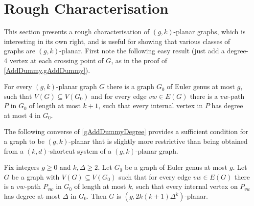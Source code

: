 \documentclass{patmorin}
\newcommand{\notex}[2]{}
\renewcommand{\geq}{\geqslant}
\begin{document}
\section{Rough Characterisation}
\label{Characterisation}

This section presents a rough characterisation of $(g,k)$-planar graphs, which is interesting in its own right, and is useful for showing that various classes of graphs are $(g,k)$-planar. First note the following easy result (just add a degree-4 vertex at each crossing point of $G$, as in the proof of \cref{AddDummy,gAddDummy}). 

\begin{lem}
\label{gAddDummyDegree}
For every $(g,k)$-planar graph $G$ there is a graph $G_0$ of Euler
genus at most $g$, such that $V(G) \subseteq V(G_0)$ and for every
edge $vw \in E(G)$ there is a $vw$-path $P$ in $G_0$ of length at most
$k+1$, such that every internal vertex in $P$ has degree at most $4$
in $G_0$.
\end{lem}

The following converse of \cref{gAddDummyDegree} provides a sufficient condition for a graph to be $(g,k)$-planar that is slightly more restrictive than being obtained from a $(k,d)$-shortcut system of a $(g,k)$-planar graph. \notex{DW}{Is this sentence clear enough?}\notex{PM}{Sure.}

\begin{lem} 
\label{DrawG}
Fix integers $g\geq 0$ and $k,\Delta\geq 2$. 
Let $G_0$ be a graph of Euler genus at most $g$. Let $G$ be
a graph with $V(G) \subseteq V(G_0)$ such that for every edge $vw \in
E(G)$ there is a $vw$-path $P_{vw}$ in $G_0$ of length at most $k$, such
that every internal vertex on $P_{vw}$ has degree at most $\Delta$ in
$G_0$. Then $G$ is $(g, 2k(k+1)\Delta^{k} )$-planar.
\end{lem}
\end{document}
